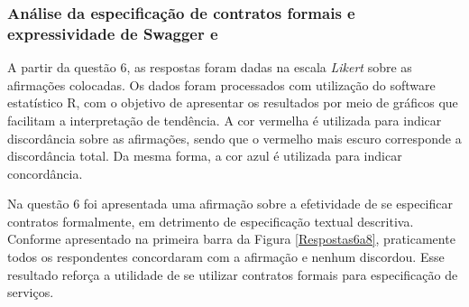   
   

\subsubsection{Análise da especificação de contratos formais e expressividade
de Swagger e \neoidl{}}

A partir da questão 6, as respostas foram dadas na escala \textit{Likert} sobre
as afirmações colocadas. Os dados foram processados com utilização do software
estatístico R, com o objetivo de apresentar os resultados por meio de gráficos
que facilitam a interpretação de tendência. A cor vermelha é utilizada para
indicar discordância sobre as afirmações, sendo que o vermelho mais escuro
corresponde a discordância total. Da mesma forma, a cor azul é utilizada para
indicar concordância.

Na questão 6 foi apresentada uma afirmação sobre a efetividade de se especificar
contratos formalmente, em detrimento de especificação textual descritiva.
Conforme apresentado na primeira barra da Figura \ref{Respostas6a8},
praticamente todos os respondentes concordaram com a afirmação e nenhum
discordou. Esse resultado reforça a utilidade de se utilizar contratos
formais para especificação de serviços.


